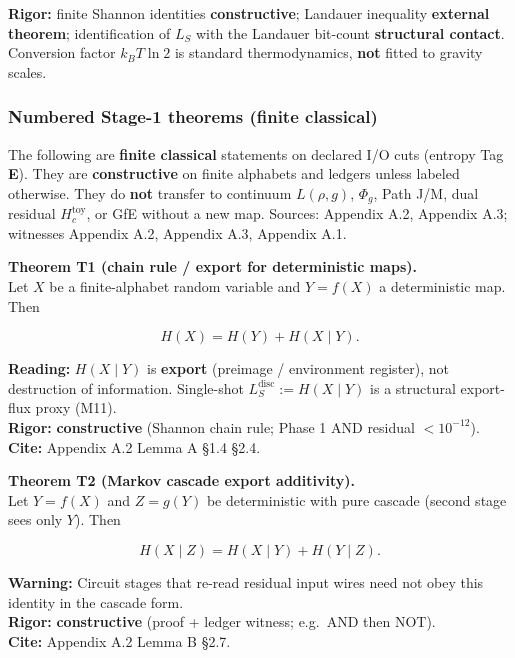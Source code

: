 \documentclass[
  11pt,
]{article}
\begin{document}
\textbf{Rigor:} finite Shannon identities \textbf{constructive}; Landauer inequality \textbf{external theorem}; identification of \(L_S\) with the Landauer bit-count \textbf{structural contact}. Conversion factor \(k_B T\ln 2\) is standard thermodynamics, \textbf{not} fitted to gravity scales.

\subsubsection{Numbered Stage-1 theorems (finite classical)}\label{numbered-stage-1-theorems-finite-classical}

The following are \textbf{finite classical} statements on declared I/O cuts (entropy Tag \textbf{E}). They are \textbf{constructive} on finite alphabets and ledgers unless labeled otherwise. They do \textbf{not} transfer to continuum \(L(\rho,g)\), \(\Phi_g\), Path J/M, dual residual \(H_c^{\mathrm{toy}}\), or GfE without a new map. Sources: Appendix A.2, Appendix A.3; witnesses Appendix A.2, Appendix A.3, Appendix A.1.

\textbf{Theorem T1 (chain rule / export for deterministic maps).}\\
Let \(X\) be a finite-alphabet random variable and \(Y=f(X)\) a deterministic map. Then

\[
H(X)=H(Y)+H(X\mid Y).
\]

\textbf{Reading:} \(H(X\mid Y)\) is \textbf{export} (preimage / environment register), not destruction of information. Single-shot \(L_S^{\mathrm{disc}}:=H(X\mid Y)\) is a structural export-flux proxy (M11).\\
\textbf{Rigor:} \textbf{constructive} (Shannon chain rule; Phase 1 AND residual \(<10^{-12}\)).\\
\textbf{Cite:} Appendix A.2 Lemma A \cdot  \S1.4 \cdot  \S2.4.

\textbf{Theorem T2 (Markov cascade export additivity).}\\
Let \(Y=f(X)\) and \(Z=g(Y)\) be deterministic with pure cascade (second stage sees only \(Y\)). Then

\[
H(X\mid Z)=H(X\mid Y)+H(Y\mid Z).
\]

\textbf{Warning:} Circuit stages that re-read residual input wires need not obey this identity in the cascade form.\\
\textbf{Rigor:} \textbf{constructive} (proof + ledger witness; e.g.~AND then NOT).\\
\textbf{Cite:} Appendix A.2 Lemma B \cdot  \S2.7.
\end{document}
